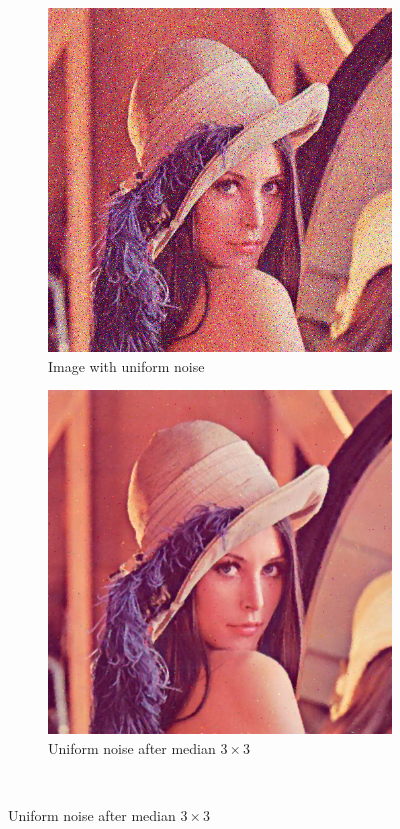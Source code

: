 \documentclass[12pt]{article}
\begin{document}
\begin{figure}[ht]\centering
    \begin{subfigure}[t]{.4\textwidth}\centering
        \includegraphics[width=.8\textwidth]{lenac_uniform3}
        \caption{Image with uniform noise}
    \end{subfigure}
    \begin{subfigure}[t]{.4\textwidth}\centering
        \includegraphics[width=.8\textwidth]{lenac_uniform_median}
        \caption{Uniform noise after median $3\times3$}
    \end{subfigure}\\[2em]

\end{figure}
\end{document}
